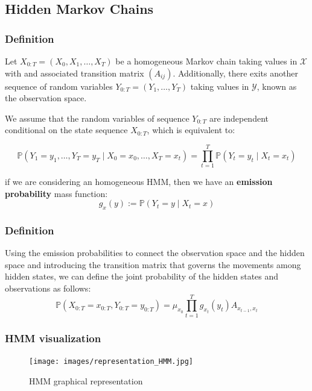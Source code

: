 \documentclass[xcolor=dvipsnames, compress]{beamer}
\begin{document}
\begin{frame}
\section{Hidden Markov Chains }
\frametitle{Definition}

Let $X_{0:T}=\left(X_{0},X_{1},\ldots,X_{T}\right)$ be a homogeneous Markov chain taking values in $\mathcal{X}$ with and associated transition matrix $\left(A_{ij}\right)$. Additionally, there exits another sequence of random variables $Y_{0:T}=\left(Y_{1},\ldots,Y_{T}\right)$ taking values in $\mathcal{Y}$, known as the observation space. 

We assume that the random variables of sequence $Y_{0:T}$ are independent conditional on the state sequence $X_{0:T}$, which is equivalent to:

$$
\mathds{P}\left(Y_{1}=y_{1},\ldots,Y_{T}=y_{T}\mid X_{0}=x_{0},\ldots,X_{T}=x_{t}\right)=\prod_{t=1}^{T}\mathds{P}\left(Y_{t}=y_{t}\mid X_{t}=x_{t}\right)
$$
	
if we are considering an homogeneous HMM, then we have an  \textbf{emission probability} mass function:
$$
g_{x}(y):=\mathds{P}\left(Y_{t}=y\mid X_{t}=x\right)
$$
\end{frame}


\begin{frame}
\frametitle{Definition}
Using the emission probabilities to connect the observation space and the hidden space and introducing the transition matrix that governs the movements among hidden states, we can define the  joint probability of the hidden states and observations as follows:
$$
\mathds{P}\left(X_{0:T}=x_{0:T},Y_{0:T}=y_{0:T}\right)=\mu_{x_{0}}\prod_{t=1}^{T}g_{x_{t}}\left(y_{t}\right)A_{x_{t-1},x_{t}}
$$
\end{frame}


\begin{frame}
	\frametitle{HMM visualization}
	\begin{figure}
		\texttt{[image: images/representation\_HMM.jpg]}
		\caption{HMM graphical representation}
	\end{figure}

\end{frame}
\end{document}

